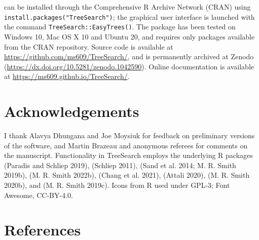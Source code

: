  can be installed through the Comprehensive R Archive
Network (CRAN) using\break
\texttt{install.packages("TreeSearch")}; the graphical user
interface is launched with the command\break
\texttt{TreeSearch::EasyTrees()}.
The package has been tested on Windows 10, Mac OS X 10 and Ubuntu 20, and
requires only packages available from the CRAN repository.
Source code is available at \url{https://github.com/ms609/TreeSearch/},
and is permanently archived at Zenodo
(\url{https://dx.doi.org/10.5281/zenodo.1042590}). Online documentation is available
at \url{https://ms609.github.io/TreeSearch/}.

\hypertarget{acknowledgements}{%
\section{Acknowledgements}\label{acknowledgements}}

I thank Alavya Dhungana and Joe Moysiuk for feedback on preliminary versions of
the software, and Martin Brazeau and anonymous referees for comments on the
manuscript. Functionality in TreeSearch employs the underlying R
packages  (Paradis and Schliep 2019),  (Schliep 2011),
 (Sand et al. 2014; M. R. Smith 2019b),  (M. R. Smith 2022b),
 (Chang et al. 2021),  (Attali 2020), 
(M. R. Smith 2020b), and  (M. R. Smith 2019c). Icons from R used under
GPL-3; Font Awesome, CC-BY-4.0.

\hypertarget{references}{%
\section*{References}\label{references}}

